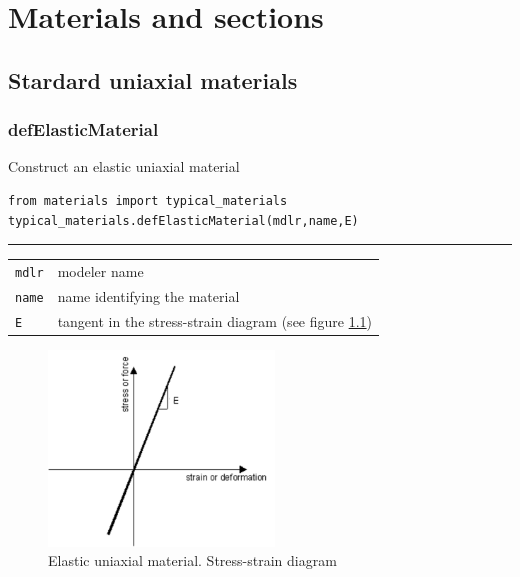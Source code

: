 \chapter{Materials and sections}
\section{Stardard uniaxial materials}
\subsection{defElasticMaterial} 
\noindent Construct an elastic uniaxial material
\begin{verbatim}
from materials import typical_materials
typical_materials.defElasticMaterial(mdlr,name,E)
\end{verbatim}
\vspace{-10pt}
{\color{grayLines} \rule{\linewidth}{0.25pt}}\begin{center}
\begin{tabular}{lp{10cm}}
{\tt mdlr} & modeler name \\
{\tt name} & name identifying the material \\
{\tt E} & tangent in the stress-strain diagram (see figure \ref{Elastic}) \\
\end{tabular}
\end{center}

\begin{figure}[h]
\centering
\includegraphics[width=60mm]{materials/figures/Elastic}
\caption{Elastic uniaxial material. Stress-strain diagram}\label{Elastic}
\end{figure}

